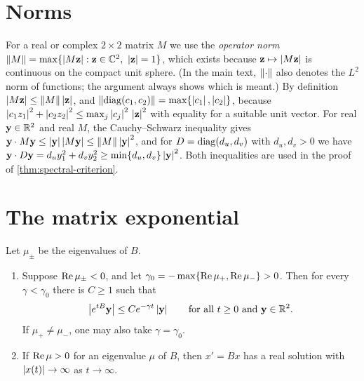 \section{Norms}\label{sec:linalg-norms}

For a real or complex $2\times2$ matrix $M$ we use the \emph{operator norm}
$\norm{M}=\max\{\abs{M\mathbf z}:\mathbf z\in\C^2,\ \abs{\mathbf z}=1\}$, which
exists because $\mathbf z\mapsto\left\lvert M\mathbf z\right\rvert$ is continuous on the compact unit
sphere. (In the main text, $\left\lVert \cdot\right\rVert$ also denotes the $L^2$ norm of
functions; the argument always shows which is meant.) By definition
$\left\lvert M\mathbf z\right\rvert\le\left\lVert M\right\rVert\left\lvert \mathbf z\right\rvert$, and
$\left\lVert \operatorname{diag}(c_1,c_2)\right\rVert=\max\{\left\lvert c_1\right\rvert,\left\lvert c_2\right\rvert\}$, because
$\left\lvert c_1z_1\right\rvert^2+\left\lvert c_2z_2\right\rvert^2\le\max_j\left\lvert c_j\right\rvert^2\,\left\lvert \mathbf z\right\rvert^2$ with equality
for a suitable unit vector. For real $\mathbf y\in\mathbb{R}^2$ and real $M$, the
Cauchy--Schwarz inequality gives
$\mathbf y\cdot M\mathbf y\le\left\lvert \mathbf y\right\rvert\left\lvert M\mathbf y\right\rvert\le\left\lVert M\right\rVert\left\lvert \mathbf y\right\rvert^2$,
and for $D=\operatorname{diag}(d_u,d_v)$ with $d_u,d_v>0$ we have
$\mathbf y\cdot D\mathbf y=d_uy_1^2+d_vy_2^2\ge\min\{d_u,d_v\}\left\lvert \mathbf y\right\rvert^2$. Both
inequalities are used in the proof of \cref{thm:spectral-criterion}.

\section{The matrix exponential}\label{sec:linalg-exponential}

\begin{proposition}\label{prop:2x2-exponential-bound}
Let $\mu_\pm$ be the eigenvalues of $B$.
\begin{enumerate}[label=(\alph*)]
  \item Suppose $\operatorname{Re}\mu_\pm<0$, and let $\gamma_0=-\max\{\operatorname{Re}\mu_+,\operatorname{Re}\mu_-\}>0$.
        Then for every $\gamma<\gamma_0$ there is $C\ge1$ such that
        \begin{equation*}
          \left\lvert e^{tB}\mathbf y\right\rvert\le Ce^{-\gamma t}\left\lvert \mathbf y\right\rvert
          \qquad\text{for all } t\ge0 \text{ and } \mathbf y\in\mathbb{R}^2 .
        \end{equation*}
        If $\mu_+\neq\mu_-$, one may also take $\gamma=\gamma_0$.
  \item If $\operatorname{Re}\mu>0$ for an eigenvalue $\mu$ of $B$, then $x'=Bx$ has a real
        solution with $\left\lvert x(t)\right\rvert\to\infty$ as $t\to\infty$.
\end{enumerate}
\end{proposition}


